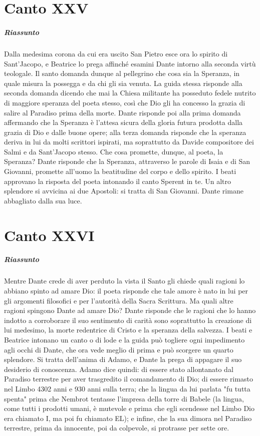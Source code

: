 \documentclass[a4paper, twoside, titlepage]{book}
\newcounter{mar}
\begin{document}
\chapter{Canto XXV}

\paragraph{Riassunto} Dalla medesima corona da cui era uscito San Pietro esce ora lo spirito di Sant’Jacopo, e Beatrice lo prega affinché esamini Dante intorno alla seconda virtù teologale. Il santo domanda dunque al pellegrino che cosa sia la Speranza, in quale misura la possegga e da chi gli sia venuta. La guida stessa risponde alla seconda domanda dicendo che mai la Chiesa militante ha posseduto fedele nutrito di maggiore speranza del poeta stesso, così che Dio gli ha concesso la grazia di salire al Paradiso prima della morte. Dante risponde poi alla prima domanda affermando che la Speranza è l’attesa sicura della gloria futura prodotta dalla grazia di Dio e dalle buone opere; alla terza domanda risponde che la speranza deriva in lui da molti scrittori ispirati, ma soprattutto da Davide compositore dei Salmi e da Sant’Jacopo stesso. Che cosa promette, dunque, al poeta, la Speranza? Dante risponde che la Speranza, attraverso le parole di Isaia e di San Giovanni, promette all’uomo la beatitudine del corpo e dello spirito. I beati approvano la risposta del poeta intonando il canto Sperent in te. Un altro splendore si avvicina ai due Apostoli: si tratta di San Giovanni. Dante rimane abbagliato dalla sua luce.

\chapter{Canto XXVI}

\paragraph{Riassunto} Mentre Dante crede di aver perduto la vista il Santo gli chiede quali ragioni lo abbiano spinto ad amare Dio: il poeta risponde che tale amore è nato in lui per gli argomenti filosofici e per l’autorità della Sacra Scrittura. Ma quali altre ragioni spingono Dante ad amare Dio? Dante risponde che le ragioni che lo hanno indotto a corroborare il suo sentimento di carità sono soprattutto la creazione di lui medesimo, la morte redentrice di Cristo e la speranza della salvezza. I beati e Beatrice intonano un canto o di lode e la guida può togliere ogni impedimento agli occhi di Dante, che ora vede meglio di prima e può scorgere un quarto splendore. Si tratta dell’anima di Adamo, e Dante la prega di appagare il suo desiderio di conoscenza. Adamo dice quindi: di essere stato allontanato dal Paradiso terrestre per aver trasgredito il comandamento di Dio; di essere rimasto nel Limbo 4302 anni e 930 anni sulla terra; che la lingua da lui parlata "fu tutta spenta" prima che Nembrot tentasse l’impresa della torre di Babele (la lingua, come tutti i prodotti umani, è mutevole e prima che egli scendesse nel Limbo Dio era chiamato I, ma poi fu chiamato EL); e infine, che la sua dimora nel Paradiso terrestre, prima da innocente, poi da colpevole, si protrasse per sette ore.
\end{document}
